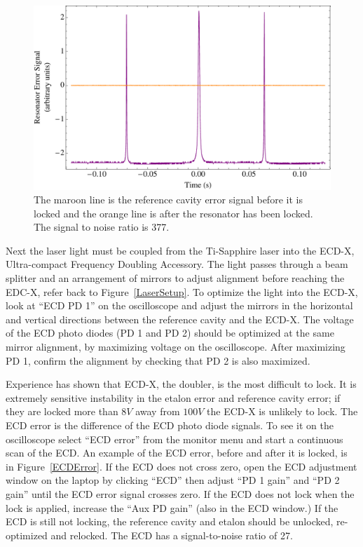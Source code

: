 \documentclass[prb,preprint]{revtex4-1}
\begin{document}
\begin{figure}[h!]
\centering
\includegraphics[width=6in]{ResonatorError.pdf}
\caption{The maroon line is the reference cavity error signal before it is locked and the orange line is after the resonator has been locked. The signal to noise ratio is 377.}
\label{ResonatorError}
\end{figure}

Next the laser light must be coupled from the Ti-Sapphire laser into the ECD-X, Ultra-compact Frequency Doubling Accessory. The light passes through a beam splitter and an arrangement of mirrors to adjust alignment before reaching the EDC-X, refer back to Figure~\ref{LaserSetup}. To optimize the light into the ECD-X, look at ``ECD PD 1'' on the oscilloscope and adjust the mirrors in the horizontal and vertical directions between the reference cavity and the ECD-X. The voltage of the ECD photo diodes (PD 1 and PD 2) should be optimized at the same mirror alignment, by maximizing voltage on the oscilloscope. After maximizing PD 1, confirm the alignment by checking that PD 2 is also maximized.

Experience has shown that ECD-X, the doubler, is the most difficult to lock. It is extremely sensitive instability in the etalon error and reference cavity error; if they are locked more than $8 V$ away from $100 V$ the ECD-X is unlikely to lock. The ECD error is the difference of the ECD photo diode signals. To see it on the oscilloscope select ``ECD error'' from the monitor menu and start a continuous scan of the ECD. An example of the ECD error, before and after it is locked, is in Figure~\ref{ECDError}. If the ECD does not cross zero, open the ECD adjustment window on the laptop by clicking ``ECD'' then adjust ``PD 1 gain'' and ``PD 2 gain'' until the ECD error signal crosses zero. If the ECD does not lock when the lock is applied, increase the ``Aux PD gain'' (also in the ECD window.) If the ECD is still not locking, the reference cavity and etalon should be unlocked, re-optimized and relocked. The ECD has a signal-to-noise ratio of 27.
\end{document}
